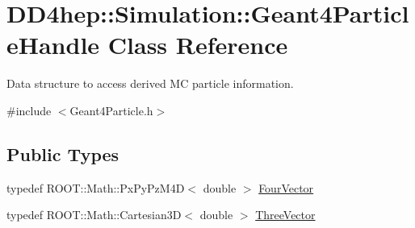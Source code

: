 \hypertarget{class_d_d4hep_1_1_simulation_1_1_geant4_particle_handle}{
\section{DD4hep::Simulation::Geant4ParticleHandle Class Reference}
\label{class_d_d4hep_1_1_simulation_1_1_geant4_particle_handle}
}


Data structure to access derived MC particle information.  


{\ttfamily \#include $<$Geant4Particle.h$>$}\subsection*{Public Types}
\begin{DoxyCompactItemize}
\item 
typedef ROOT::Math::PxPyPzM4D$<$ double $>$ \hyperlink{class_d_d4hep_1_1_simulation_1_1_geant4_particle_handle_a79648f819b70d2f741fd1a5e19dc2f23}{FourVector}
\item 
typedef ROOT::Math::Cartesian3D$<$ double $>$ \hyperlink{class_d_d4hep_1_1_simulation_1_1_geant4_particle_handle_a8aabe9ad3397b25aae653c42ec82021a}{ThreeVector}
\end{DoxyCompactItemize}
